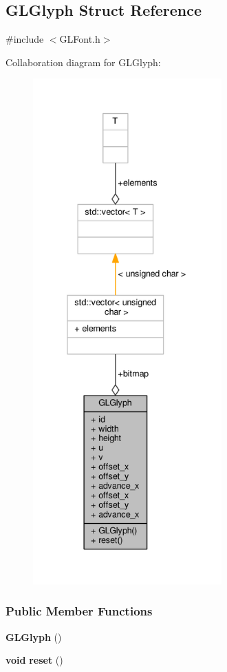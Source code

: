 \subsection{G\+L\+Glyph Struct Reference}
\label{structGLGlyph}


{\ttfamily \#include $<$G\+L\+Font.\+h$>$}



Collaboration diagram for G\+L\+Glyph\+:
\nopagebreak
\begin{figure}[H]
\begin{center}
\leavevmode
\includegraphics[height=550pt]{df/d73/structGLGlyph__coll__graph}
\end{center}
\end{figure}
\subsubsection*{Public Member Functions}
\begin{DoxyCompactItemize}
\item 
{\bf G\+L\+Glyph} ()
\item 
{\bf void} {\bf reset} ()
\end{DoxyCompactItemize}

